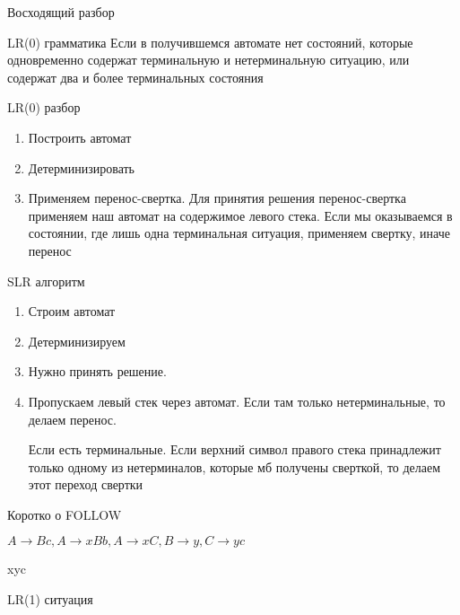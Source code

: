 \begin{para}{Восходящий разбор}
\begin{defe}{LR(0) грамматика}
Если в получившемся автомате нет состояний, которые одновременно содержат терминальную и нетерминальную ситуацию, или содержат два и более терминальных состояния

\end{defe}



\begin{defe}{LR(0) разбор}

\begin{enumerate}

  \item Построить автомат

  \item Детерминизировать

  \item Применяем перенос-свертка. Для принятия решения перенос-свертка применяем наш автомат на содержимое левого стека. Если мы оказываемся в состоянии, где лишь одна терминальная ситуация, применяем свертку, иначе перенос
  
\end{enumerate}

\end{defe}

\begin{defe}{SLR алгоритм}

\begin{enumerate}

  \item Строим автомат

  \item Детерминизируем

  \item Нужно принять решение.

  \item Пропускаем левый стек через автомат. Если там только нетерминальные, то делаем перенос.

Если есть терминальные. Если верхний символ правого стека принадлежит только одному из нетерминалов, которые мб получены сверткой, то делаем этот переход свертки

\end{enumerate}

\end{defe}

Коротко о FOLLOW

$A \rightarrow Bc, A \rightarrow xBb, A \rightarrow xC, B \rightarrow y, C \rightarrow yc$

xyc

\begin{defe}{LR(1) ситуация}


\end{defe}
\end{para}
